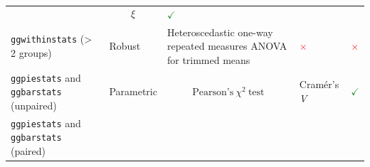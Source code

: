 \documentclass[]{article}
\begin{document}
\begin{longtable}[]{@{}lllll@{}}
\begin{minipage}[t]{0.31\columnwidth}
\end{minipage} & \begin{minipage}[t]{0.12\columnwidth}\raggedright
\[\xi\]\strut
\end{minipage} & \begin{minipage}[t]{0.07\columnwidth}\raggedright
\textcolor{ForestGreen}{$\checkmark$}\strut
\end{minipage}\tabularnewline
\begin{minipage}[t]{0.20\columnwidth}\raggedright
\texttt{ggwithinstats} (\textgreater{} 2 groups)\strut
\end{minipage} & \begin{minipage}[t]{0.16\columnwidth}\raggedright
Robust\strut
\end{minipage} & \begin{minipage}[t]{0.31\columnwidth}\raggedright
Heteroscedastic one-way repeated measures ANOVA for trimmed means\strut
\end{minipage} & \begin{minipage}[t]{0.12\columnwidth}\raggedright
\textcolor{red}{$\times$}\strut
\end{minipage} & \begin{minipage}[t]{0.07\columnwidth}\raggedright
\textcolor{red}{$\times$}\strut
\end{minipage}\tabularnewline
\begin{minipage}[t]{0.20\columnwidth}\raggedright
\texttt{ggpiestats} and \texttt{ggbarstats} (unpaired)\strut
\end{minipage} & \begin{minipage}[t]{0.16\columnwidth}\raggedright
Parametric\strut
\end{minipage} & \begin{minipage}[t]{0.31\columnwidth}\raggedright
\[\text{Pearson's}~ \chi^2 ~\text{test}\]\strut
\end{minipage} & \begin{minipage}[t]{0.12\columnwidth}\raggedright
Cramér's \emph{V}\strut
\end{minipage} & \begin{minipage}[t]{0.07\columnwidth}\raggedright
\textcolor{ForestGreen}{$\checkmark$}\strut
\end{minipage}\tabularnewline
\begin{minipage}[t]{0.20\columnwidth}\raggedright
\texttt{ggpiestats} and \texttt{ggbarstats} (paired)\strut
\end{minipage} & \begin{minipage}[t]{0.16\columnwidth}\raggedright

\end{minipage}
\end{longtable}
\end{document}
